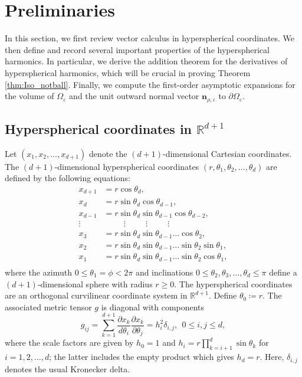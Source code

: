 \documentclass[11pt]{amsart}
\theoremstyle{definition}
\theoremstyle{plain}
\theoremstyle{remark}
\newcommand{\R}{\mathbb{R}}
\newcommand{\vareps}{\varepsilon}
\newcommand{\del}{\partial}
\newcommand{\n}{\mathbf{n}}
\begin{document}
\section{Preliminaries} \label{sec:prelim} 
In this section, we first review vector calculus in hyperspherical coordinates. We then define and record several important properties of the hyperspherical harmonics. In particular, we derive the addition theorem for the derivatives of hyperspherical harmonics, which will be crucial in proving Theorem \ref{thm:Iso_notball}. Finally, we compute the first-order asymptotic expansions for the volume of $\Omega_\vareps$ and the unit outward normal vector $\n_{\rho, \vareps}$ to $\del\Omega_\vareps$. 

\subsection{Hyperspherical coordinates in $\R^{d + 1}$} \label{sec:Coordinates} 
Let $(x_1, x_2, \dots, x_{d + 1})$ denote the $(d + 1)$-dimensional Cartesian coordinates. The $(d + 1)$-dimensional hyperspherical coordinates $(r, \theta_1, \theta_2, \dots, \theta_d)$ are defined by the following equations: 
\begin{align*} 
x_{d + 1} & = r\cos\theta_d, \\ 
x_d & = r\sin\theta_d\cos\theta_{d - 1}, \\ 
x_{d - 1} & = r\sin\theta_d\sin\theta_{d - 1}\cos\theta_{d - 2}, \\ 
\vdots & \qquad \ \ \vdots \qquad \ \ \vdots \qquad \ \ \vdots \\ 
x_3 & = r\sin\theta_d\sin\theta_{d - 1}\dots\cos\theta_2, \\ 
x_2 & = r\sin\theta_d\sin\theta_{d - 1}\dots\sin\theta_2\sin\theta_1, \\ 
x_1 & = r\sin\theta_d\sin\theta_{d - 1}\dots\sin\theta_2\cos\theta_1,  \\ 
\end{align*} 
where the azimuth $0\le \theta_1 = \phi< 2\pi$ and inclinations $0\le \theta_2, \theta_3, \dots, \theta_d\le\pi$ define a $(d + 1)$-dimensional sphere with radius $r\ge 0$. The hyperspherical coordinates are an orthogonal curvilinear coordinate system in $\R^{d + 1}$. Define $\theta_0\coloneqq r$. The associated metric tensor $g$ is diagonal with components 
\begin{equation} \label{eq:SCmetric} 
g_{ij} = \sum_{k = 1}^{d + 1} \frac{\del x_k}{d\theta_i}\frac{\del x_k}{\del\theta_j} = h_i^2\delta_{i,j}, \ \ 0\le i, j\le d, 
\end{equation} 
where the scale factors are given by $h_0 = 1$ and $h_i = r\prod_{k = i + 1}^d \sin\theta_k$ for $i = 1, 2, \dots, d$; the latter includes the empty product which gives $h_d = r$. Here, $\delta_{i, j}$ denotes the usual Kronecker delta. 
\end{document}
